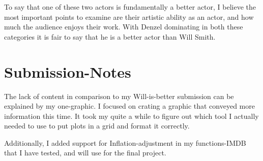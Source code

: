 \documentclass[]{article}
\begin{document}
\noindent To say that one of these two actors is fundamentally a better
actor, I believe the most important points to examine are their artistic
ability as an actor, and how much the audience enjoys their work. With
Denzel dominating in both these categories it is fair to say that he is
a better actor than Will Smith.

\section{Submission-Notes}
\label{sec:submission-notes}

\noindent The lack of content in comparison to my Will-is-better
submission can be explained by my one-graphic. I focused on crating a
graphic that conveyed more information this time. It took my quite a
while to figure out which tool I actually needed to use to put plots in
a grid and format it correctly. \newline

\noindent Additionally, I added support for Inflation-adjustment in my
functions-IMDB that I have tested, and will use for the final project.






\newpage
\theendnotes

\newpage
\begin{auxmulticols}{1}
\singlespacing 


\end{auxmulticols}

\newpage
{
\hypersetup{linkcolor=black}
\setcounter{tocdepth}{3}
\tableofcontents
}
\end{document}
